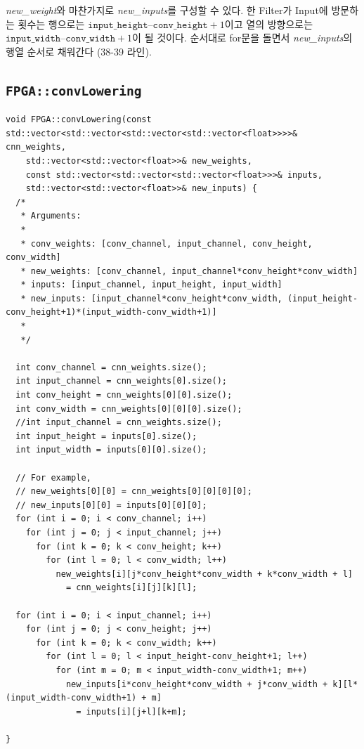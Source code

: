 \documentclass{article}
\begin{document}
\textit{new\_weight}와 마찬가지로 \textit{new\_inputs}를 구성할 수 있다. 한 Filter가 Input에 방문하는 횟수는 행으로는 \linebreak$\texttt{input\_height} – \texttt{conv\_height} + 1$이고 열의 방향으로는 $\texttt{input\_width} – \texttt{conv\_width} + 1$이 될 것이다. 순서대로 for문을 돌면서 \textit{new\_inputs}의 행열 순서로 채워간다 (38-39 라인).

\subsection*{\texttt{FPGA::convLowering}}
\begin{lstlisting}[style={c-style}]
void FPGA::convLowering(const std::vector<std::vector<std::vector<std::vector<float>>>>& cnn_weights,
    std::vector<std::vector<float>>& new_weights,
    const std::vector<std::vector<std::vector<float>>>& inputs,
    std::vector<std::vector<float>>& new_inputs) {
  /*
   * Arguments:
   *
   * conv_weights: [conv_channel, input_channel, conv_height, conv_width]
   * new_weights: [conv_channel, input_channel*conv_height*conv_width]
   * inputs: [input_channel, input_height, input_width]
   * new_inputs: [input_channel*conv_height*conv_width, (input_height-conv_height+1)*(input_width-conv_width+1)]
   *
   */

  int conv_channel = cnn_weights.size();
  int input_channel = cnn_weights[0].size();
  int conv_height = cnn_weights[0][0].size();
  int conv_width = cnn_weights[0][0][0].size();
  //int input_channel = cnn_weights.size();
  int input_height = inputs[0].size();
  int input_width = inputs[0][0].size();

  // For example,
  // new_weights[0][0] = cnn_weights[0][0][0][0];
  // new_inputs[0][0] = inputs[0][0][0];
  for (int i = 0; i < conv_channel; i++)
    for (int j = 0; j < input_channel; j++)
      for (int k = 0; k < conv_height; k++)
        for (int l = 0; l < conv_width; l++)
          new_weights[i][j*conv_height*conv_width + k*conv_width + l] 
            = cnn_weights[i][j][k][l];

  for (int i = 0; i < input_channel; i++)
    for (int j = 0; j < conv_height; j++)
      for (int k = 0; k < conv_width; k++)
        for (int l = 0; l < input_height-conv_height+1; l++)
          for (int m = 0; m < input_width-conv_width+1; m++)
            new_inputs[i*conv_height*conv_width + j*conv_width + k][l*(input_width-conv_width+1) + m] 
              = inputs[i][j+l][k+m];

}
\end{lstlisting}
\newpage
\end{document}

